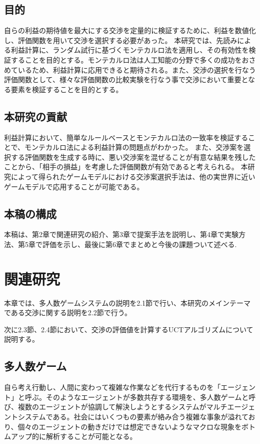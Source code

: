\documentclass[a4, 10pt,dvipdfmx]{jsarticle}
\begin{document}
\subsection{目的}

自らの利益の期待値を最大にする交渉を定量的に検証するために、利益を数値化し、評価関数を用いて交渉を選択する必要があった。
本研究では、先読みによる利益計算に、ランダム試行に基づくモンテカルロ法を適用し、その有効性を検証することを目的とする。モンテカルロ法は人工知能の分野で多くの成功をおさめているため、利益計算に応用できると期待される。また、交渉の選択を行なう評価関数として、様々な評価関数の比較実験を行なう事で交渉において重要となる要素を検証することを目的とする。

\subsection{本研究の貢献}

利益計算において、簡単なルールベースとモンテカルロ法の一致率を検証することで、モンテカルロ法による利益計算の問題点がわかった。
また、交渉案を選択する評価関数を生成する時に、悪い交渉案を混ぜることが有意な結果を残したことから、「相手の損益」を考慮した評価関数が有効であると考えられる。
本研究によって得られたゲームモデルにおける交渉案選択手法は、他の実世界に近いゲームモデルで応用することが可能である。

\subsection{本稿の構成}

本稿は、第2章で関連研究の紹介、第3章で提案手法を説明し、第4章で実験方法、第5章で評価を示し、最後に第6章でまとめと今後の課題ついて述べる.


\section{関連研究}

本章では、多人数ゲームシステムの説明を2.1節で行い、本研究のメインテーマである交渉に関する説明を2.2節で行う。

次に2.3節、2.4節において、交渉の評価値を計算するUCTアルゴリズムについて説明する。

\subsection{多人数ゲーム}
自ら考え行動し、人間に変わって複雑な作業などを代行するものを「エージェント」と呼ぶ。そのようなエージェントが多数共存する環境を、多人数ゲームと呼び、複数のエージェントが協調して解決しようとするシステムがマルチエージェントシステムである。社会にはいくつもの要素が絡み合う複雑な事象が溢れており、個々のエージェントの動きだけでは想定できないようなマクロな現象をボトムアップ的に解析することが可能となる。
\end{document}
